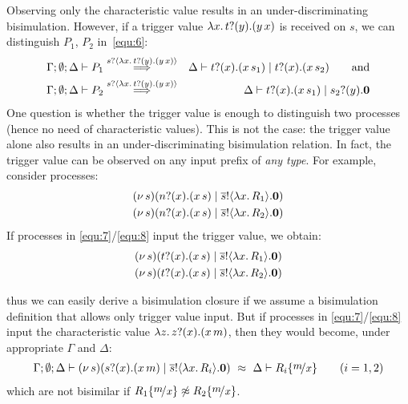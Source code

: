 \begin{example}
	Observing only the characteristic value 
	results in an under-discriminating bisimulation.
	However, if a trigger value
	$\lambda {x}.\,t ? (y) . (y\, {{x}})$ 
	is received on $s$, 
	we can distinguish $P_1$, $P_2$ in~\eqref{equ:6}:  
	\begin{eqnarray*}
		\Gamma; \emptyset; \Delta \vdash
		P_1 &\stackrel{s ? \langle \lambda {x}.\,t ? (y) . (y\, {{x}}) \rangle}{\Longrightarrow}& \Delta \vdash t ? (x) . (x\, {s_1}) \;|\; t ? (x) . (x\, {s_2})
		\qquad \mbox{and}\\
		\Gamma; \emptyset; \Delta \vdash
		P_2 &\stackrel{s ? \langle \lambda {x}.\,t ? (y) . (y\, {{x}}) \rangle}{\Longrightarrow}& \Delta \vdash t ? (x) . (x\, {s_1}) \;|\; s_2 ? (y) . \mathbf{0} 
	\end{eqnarray*}
%
	One question is whether the trigger value is enough
	to distinguish two processes (hence no need of characteristic values). %
	This is not the case: the trigger value
	alone also results in an under-discriminating bisimulation relation.
	In fact, the  trigger value can be observed on any input prefix
	of {\em any type}. For example, consider processes:
%
	\begin{eqnarray}
		(\nu\, s)(n ? (x) . (x\, {s}) \;|\; \overline{s} ! \langle \lambda x.\,R_1 \rangle . \mathbf{0}) 
		\label{equ:7}
		\\
		(\nu\, s)(n ? (x) . (x\, {s}) \;|\; \overline{s} ! \langle \lambda x.\,R_2 \rangle . \mathbf{0}) 
		\label{equ:8}
	\end{eqnarray}
%
	\noi If processes in \eqref{equ:7}/\eqref{equ:8}
	input the trigger value, we obtain:
%
	\begin{eqnarray*}
		(\nu\, s)(t ? (x) . (x\, {s}) \;|\; \overline{s} ! \langle \lambda x.\,R_1 \rangle . \mathbf{0}) 
		\\
		(\nu\, s)(t ? (x) . (x\, {s}) \;|\; \overline{s} ! \langle \lambda x.\,R_2 \rangle . \mathbf{0})
	\end{eqnarray*}

	\noi thus we can easily derive a bisimulation closure if we 
	assume a bisimulation definition that allows only trigger value input.
%
	But if processes in \eqref{equ:7}/\eqref{equ:8}
	input the characteristic value $\lambda z.\,z ? (x) . (x\, {m})$,  
	then they would become, under appropriate $\Gamma$ and $\Delta$:
%
	\begin{eqnarray*}
		\Gamma; \es; \Delta \proves \newsp{s}{\binp{s}{x} (\appl{x}{m}) \Par \bout{\dual{s}}{\abs{x} R_i} \inact}\ \wbc\ \Delta \proves R_i \subst{m}{x}
	\qquad (i=1,2)
	\end{eqnarray*}
%
	\noi which are not bisimilar if $R_1 \subst{m}{x} \not\wbc R_2 \subst{m}{x}$.
	

\end{example}
